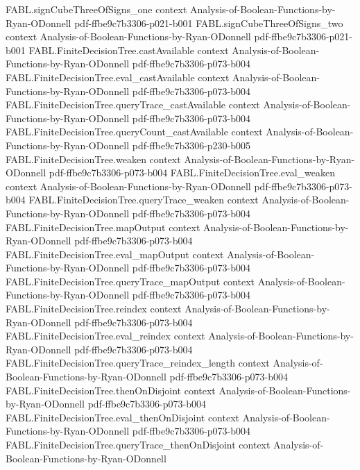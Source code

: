 \begin{theorem}
\proofstep
  {FABL.signCubeThreeOfSigns_one}
  {context}
  {Analysis-of-Boolean-Functions-by-Ryan-ODonnell}
  {pdf-ffbe9c7b3306-p021-b001}
\proofstep
  {FABL.signCubeThreeOfSigns_two}
  {context}
  {Analysis-of-Boolean-Functions-by-Ryan-ODonnell}
  {pdf-ffbe9c7b3306-p021-b001}
\proofstep
  {FABL.FiniteDecisionTree.castAvailable}
  {context}
  {Analysis-of-Boolean-Functions-by-Ryan-ODonnell}
  {pdf-ffbe9c7b3306-p073-b004}
\proofstep
  {FABL.FiniteDecisionTree.eval_castAvailable}
  {context}
  {Analysis-of-Boolean-Functions-by-Ryan-ODonnell}
  {pdf-ffbe9c7b3306-p073-b004}
\proofstep
  {FABL.FiniteDecisionTree.queryTrace_castAvailable}
  {context}
  {Analysis-of-Boolean-Functions-by-Ryan-ODonnell}
  {pdf-ffbe9c7b3306-p073-b004}
\proofstep
  {FABL.FiniteDecisionTree.queryCount_castAvailable}
  {context}
  {Analysis-of-Boolean-Functions-by-Ryan-ODonnell}
  {pdf-ffbe9c7b3306-p230-b005}
\proofstep
  {FABL.FiniteDecisionTree.weaken}
  {context}
  {Analysis-of-Boolean-Functions-by-Ryan-ODonnell}
  {pdf-ffbe9c7b3306-p073-b004}
\proofstep
  {FABL.FiniteDecisionTree.eval_weaken}
  {context}
  {Analysis-of-Boolean-Functions-by-Ryan-ODonnell}
  {pdf-ffbe9c7b3306-p073-b004}
\proofstep
  {FABL.FiniteDecisionTree.queryTrace_weaken}
  {context}
  {Analysis-of-Boolean-Functions-by-Ryan-ODonnell}
  {pdf-ffbe9c7b3306-p073-b004}
\proofstep
  {FABL.FiniteDecisionTree.mapOutput}
  {context}
  {Analysis-of-Boolean-Functions-by-Ryan-ODonnell}
  {pdf-ffbe9c7b3306-p073-b004}
\proofstep
  {FABL.FiniteDecisionTree.eval_mapOutput}
  {context}
  {Analysis-of-Boolean-Functions-by-Ryan-ODonnell}
  {pdf-ffbe9c7b3306-p073-b004}
\proofstep
  {FABL.FiniteDecisionTree.queryTrace_mapOutput}
  {context}
  {Analysis-of-Boolean-Functions-by-Ryan-ODonnell}
  {pdf-ffbe9c7b3306-p073-b004}
\proofstep
  {FABL.FiniteDecisionTree.reindex}
  {context}
  {Analysis-of-Boolean-Functions-by-Ryan-ODonnell}
  {pdf-ffbe9c7b3306-p073-b004}
\proofstep
  {FABL.FiniteDecisionTree.eval_reindex}
  {context}
  {Analysis-of-Boolean-Functions-by-Ryan-ODonnell}
  {pdf-ffbe9c7b3306-p073-b004}
\proofstep
  {FABL.FiniteDecisionTree.queryTrace_reindex_length}
  {context}
  {Analysis-of-Boolean-Functions-by-Ryan-ODonnell}
  {pdf-ffbe9c7b3306-p073-b004}
\proofstep
  {FABL.FiniteDecisionTree.thenOnDisjoint}
  {context}
  {Analysis-of-Boolean-Functions-by-Ryan-ODonnell}
  {pdf-ffbe9c7b3306-p073-b004}
\proofstep
  {FABL.FiniteDecisionTree.eval_thenOnDisjoint}
  {context}
  {Analysis-of-Boolean-Functions-by-Ryan-ODonnell}
  {pdf-ffbe9c7b3306-p073-b004}
\proofstep
  {FABL.FiniteDecisionTree.queryTrace_thenOnDisjoint}
  {context}
  {Analysis-of-Boolean-Functions-by-Ryan-ODonnell}

\end{theorem}
